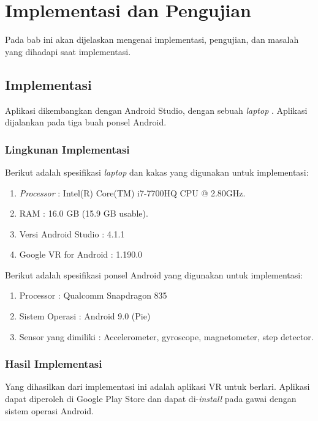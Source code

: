 \chapter{Implementasi dan Pengujian}

Pada bab ini akan dijelaskan mengenai implementasi, pengujian, dan masalah yang dihadapi saat implementasi. 

\section{Implementasi}
Aplikasi dikembangkan dengan Android Studio, dengan sebuah \textit{laptop} . Aplikasi dijalankan pada tiga buah ponsel Android.

\subsection{Lingkunan Implementasi}
Berikut adalah spesifikasi \textit{laptop} dan kakas yang digunakan untuk implementasi:

\begin{enumerate}
	\item \textit{Processor} : Intel(R) Core(TM) i7-7700HQ CPU @ 2.80GHz.
	
	\item RAM : 16.0 GB (15.9 GB usable).
	
	\item Versi Android Studio : 4.1.1
	
	\item Google VR for Android : 1.190.0
\end{enumerate}

Berikut adalah spesifikasi ponsel Android yang digunakan untuk implementasi:

\begin{enumerate}
	\item Processor : Qualcomm Snapdragon 835
	
	\item Sistem Operasi : Android 9.0 (Pie)
	
	\item Sensor yang dimiliki : Accelerometer, gyroscope, magnetometer, step detector.  
\end{enumerate}

\subsection{Hasil Implementasi}
Yang dihasilkan dari implementasi ini adalah aplikasi VR untuk berlari. Aplikasi dapat diperoleh di Google Play Store dan dapat di-\textit{install} pada gawai dengan sistem operasi Android. 


